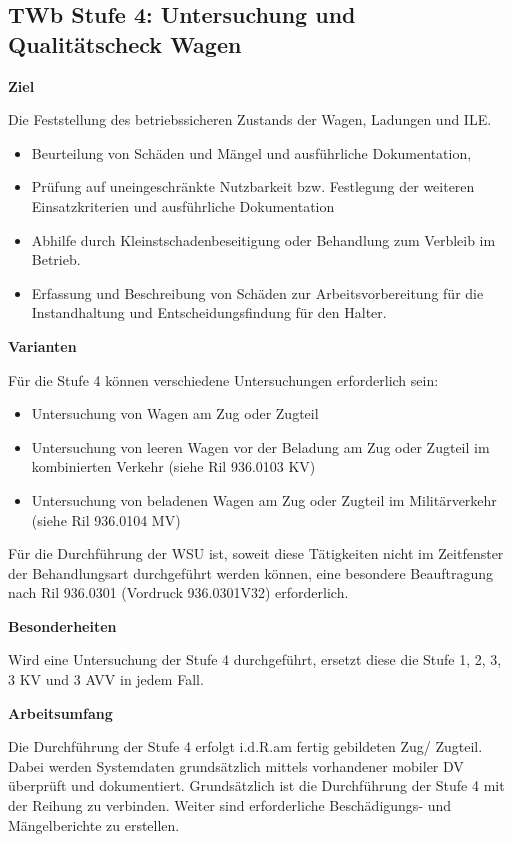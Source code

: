 \subsection{TWb Stufe 4: Untersuchung und Qualitätscheck Wagen}
\textbf{Ziel} \par
Die Feststellung des betriebssicheren Zustands der Wagen,
Ladungen und ILE.
\begin{itemize}
    \item Beurteilung von Schäden und Mängel und ausführliche Dokumentation,
    \item Prüfung auf uneingeschränkte Nutzbarkeit bzw. Festlegung der weiteren Einsatzkriterien und ausführliche Dokumentation
    \item Abhilfe durch Kleinstschadenbeseitigung oder Behandlung zum Verbleib im Betrieb.
    \item Erfassung und Beschreibung von Schäden zur Arbeitsvorbereitung für die Instandhaltung und Entscheidungsfindung für den Halter.
\end{itemize}
\textbf{Varianten} \par
Für die Stufe 4 können verschiedene Untersuchungen erforderlich sein:
\begin{itemize}
    \item Untersuchung von Wagen am Zug oder Zugteil
    \item Untersuchung von leeren Wagen vor der Beladung am Zug oder Zugteil im kombinierten Verkehr (siehe Ril 936.0103 KV)
    \item Untersuchung von beladenen Wagen am Zug oder Zugteil im Militärverkehr (siehe Ril 936.0104 MV)
\end{itemize}
Für die Durchführung der WSU ist, soweit diese Tätigkeiten nicht im Zeitfenster der Behandlungsart durchgeführt werden können, eine besondere Beauftragung nach Ril 936.0301 (Vordruck 936.0301V32) erforderlich.\par
\textbf{Besonderheiten} \par
Wird eine Untersuchung der Stufe 4 durchgeführt, ersetzt diese die Stufe 1, 2, 3, 3 KV und 3 AVV in jedem Fall. \par
\textbf{Arbeitsumfang} \par
Die Durchführung der Stufe 4 erfolgt i.d.R.am fertig gebildeten Zug/ Zugteil. Dabei werden Systemdaten grundsätzlich mittels vorhandener mobiler DV überprüft und dokumentiert. Grundsätzlich ist die Durchführung der Stufe 4 mit der Reihung zu verbinden. Weiter sind erforderliche Beschädigungs- und Mängelberichte zu erstellen.\par

